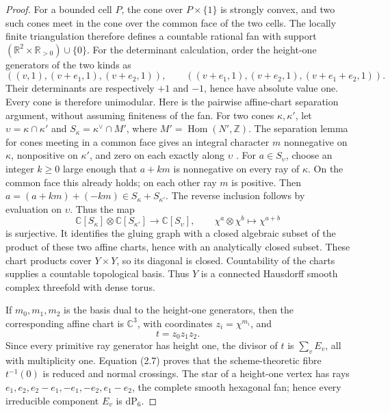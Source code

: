 \begin{proof}
For a bounded cell \(P\), the cone over \(P\times\{1\}\) is strongly
convex, and two such cones meet in the cone over the common face of the two
cells.  The locally finite triangulation therefore defines a countable
rational fan with support
\((\mathbb R^2\times\mathbb R_{>0})\cup\{0\}\).  For the determinant
calculation, order the height-one generators of the two kinds as
\[
 ((v,1),(v+e_1,1),(v+e_2,1)),\qquad
 ((v+e_1,1),(v+e_2,1),(v+e_1+e_2,1)).
\]
Their determinants are respectively \(+1\) and \(-1\), hence have absolute
value one.  Every cone is therefore unimodular.  Here is the pairwise
affine-chart separation argument, without assuming finiteness of the fan.
For two cones \(\kappa,\kappa'\), let \(\upsilon=\kappa\cap\kappa'\)
and \(S_\kappa=\kappa^\vee\cap M'\), where \(M'=\operatorname{Hom}(N',\mathbb Z)\).
The separation lemma for cones meeting in a common face gives an integral
character \(m\) nonnegative on \(\kappa\), nonpositive on \(\kappa'\),
and zero on each exactly along \(\upsilon\)
\cite[Lemma~1.2.13 and Proposition~3.1.3, pp.~28--29 and 106--107]{CoxLittleSchenck2011}.
For \(a\in S_\upsilon\), choose an integer \(k\ge0\) large enough
that \(a+km\) is nonnegative on every ray of \(\kappa\).  On the
common face this already holds; on each other ray \(m\) is positive.
Then \(a=(a+km)+(-km)\in S_\kappa+S_{\kappa'}\).  The reverse
inclusion follows by evaluation on \(\upsilon\).  Thus the map
\[
 \mathbb C[S_\kappa]\otimes\mathbb C[S_{\kappa'}]
 \longrightarrow\mathbb C[S_\upsilon],\qquad
 \chi^a\otimes\chi^b\longmapsto\chi^{a+b}
\]
is surjective.  It identifies the gluing graph with a closed algebraic
subset of the product of these two affine charts, hence with an
analytically closed subset.  These chart products cover \(Y\times Y\),
so its diagonal is closed.  Countability of the charts supplies a
countable topological basis.  Thus \(Y\) is a
connected Hausdorff smooth complex threefold with dense torus.

If \(m_0,m_1,m_2\) is the basis dual to the height-one generators, then the
corresponding affine chart is \(\mathbb C^3\), with coordinates
\(z_i=\chi^{m_i}\), and
\[
 t=z_0z_1z_2.
\tag{2.7}
\]
Since every primitive ray generator has height one, the divisor of \(t\) is
\(\sum_vE_v\), all with multiplicity one.  Equation (2.7) proves that the
scheme-theoretic fibre \(t^{-1}(0)\) is reduced and normal crossings.
The star of a height-one vertex has rays
\(e_1,e_2,e_2-e_1,-e_1,-e_2,e_1-e_2\), the complete smooth hexagonal fan;
hence every irreducible component \(E_v\) is \(\mathrm{dP}_6\).


\end{proof}
